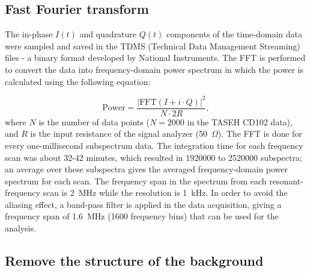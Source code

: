 
\subsection{Fast Fourier transform}
\label{sec:FFT}
The in-phase $I(t)$ and quadrature $Q(t)$ components of the time-domain 
data were sampled and saved in the TDMS 
(Technical Data Management Streaming) files - a 
binary format developed by National Instruments.
The FFT is performed to convert the data into 
frequency-domain power spectrum in which the power is calculated 
using the following equation:

\begin{equation}
\label{eq:4.1}
    \text{Power} = \frac{|\text{FFT}(I+i \cdot Q)|^{2}}{N \cdot 2R},
\end{equation}
where $N$ is the number of data points ($N  = 2000$ in the TASEH 
CD102 data), and $R$ is the input resistance of the signal analyzer 
(50~$\Omega$).
The FFT is done for every one-millisecond subspectrum data. The integration 
time for each frequency scan was about 32-42 minutes, which resulted 
in 1920000 to 2520000 subspectra; an average over these subspectra gives 
the averaged frequency-domain power spectrum for each scan. 
The frequency span in the spectrum from each resonant-frequency scan is 
2~MHz while the resolution is 1~kHz. In order to avoid the aliasing 
effect, a band-pass filter is applied in the data acquisition, 
giving a frequency span of 1.6~MHz (1600 frequency bins) that can be used 
for the analysis. 


\subsection{Remove the structure of the background}

